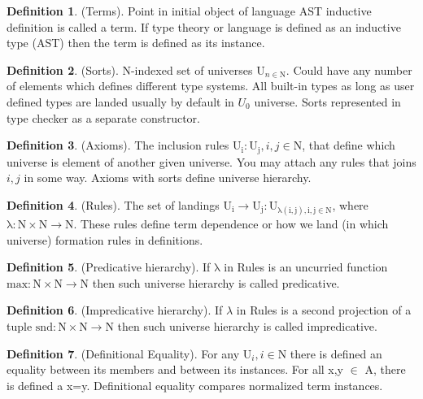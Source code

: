 \documentclass{article}
\theoremstyle{definition}
\newtheorem{definition}{Definition}
\begin{document}
\begin{definition} (Terms). Point in initial object of language AST
inductive definition is called a term. If type theory or language is defined as
an inductive type (AST) then the term is defined as its instance.
\end{definition}

\begin{definition} (Sorts). N-indexed set of universes $\mathrm{U}_{n \in \mathrm{N}}$.
Could have any number of elements which defines different type systems. All built-in
types as long as user defined types are landed usually by default in $U_0$ universe.
Sorts represented in type checker as a separate constructor.
\end{definition}

\begin{definition} (Axioms). The inclusion rules {\bf $\mathrm{U_i : U_j}, i,j \in \mathrm{N}$},
that define which universe is element of another given universe. You may attach
any rules that joins $i,j$ in some way. Axioms with sorts define universe hierarchy.
\end{definition}

\begin{definition} (Rules). The set of landings
$\mathrm{U_i} \rightarrow \mathrm{U_j} : \mathrm{U_{\lambda(i,j), i,j \in \mathrm{N}}}$,
where $\mathrm{\lambda : N \times N \rightarrow N}$. These rules define term dependence or
how we land (in which universe) formation rules in definitions.
\end{definition}

\begin{definition} (Predicative hierarchy). If $\mathrm{\lambda}$ in Rules
is an uncurried function $\mathrm{max : N \times N \rightarrow N}$
then such universe hierarchy is called predicative.
\end{definition}

\begin{definition} (Impredicative hierarchy). If $\lambda$ in Rules
is a second projection of a tuple $\mathrm{snd : N \times N \rightarrow N}$
then such universe hierarchy is called impredicative.
\end{definition}

\begin{definition} (Definitional Equality). For any $\mathrm{U}_i, i \in \mathrm{N}$ there is
defined an equality between its members and between its instances.
For all x,y $\in$ A, there is defined a x=y. Definitional equality
compares normalized term instances.
\end{definition}
\end{document}
